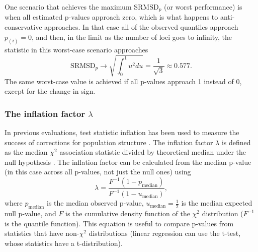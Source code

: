 \documentclass[11pt]{article}
\newcommand{\rmsd}{\text{SRMSD}_p}
\begin{document}
One scenario that achieves the maximum $\rmsd$ (or worst performance) is when all estimated p-values approach zero, which is what happens to anti-conservative approaches.
In that case all of the observed quantiles approach $p_{(i)} = 0$, and then, in the limit as the number of loci goes to infinity, the statistic in this worst-case scenario approaches
$$
\rmsd
\rightarrow
\sqrt{ \int_0^1 u^2 du }
=
\frac{1}{ \sqrt{ 3 } }
\approx
0.577
.
$$
The same worst-case value is achieved if all p-values approach 1 instead of 0, except for the change in sign.

\subsubsection{The inflation factor $\lambda$}

In previous evaluations, test statistic inflation has been used to measure the success of corrections for population structure \citep{astle_population_2009, price_new_2010}.
The inflation factor $\lambda$ is defined as the median $\chi^2$ association statistic divided by theoretical median under the null hypothesis \citep{devlin_genomic_1999}.
The inflation factor can be calculated from the median p-value (in this case across all p-values, not just the null ones) using
$$
\lambda
=
\frac{
  F^{-1} \left( 1 - p_\text{median} \right)
}{
  F^{-1} \left( 1 - u_\text{median} \right)
}
,
$$
where $p_\text{median}$ is the median observed p-value,
$u_\text{median} = \frac{1}{2}$ is the median expected null p-value,
and $F$ is the cumulative density function of the $\chi^2$ distribution ($F^{-1}$ is the quantile function).
This equation is useful to compare p-values from statistics that have non-$\chi^2$ distributions (linear regression can use the t-test, whose statistics have a t-distribution).
\end{document}
